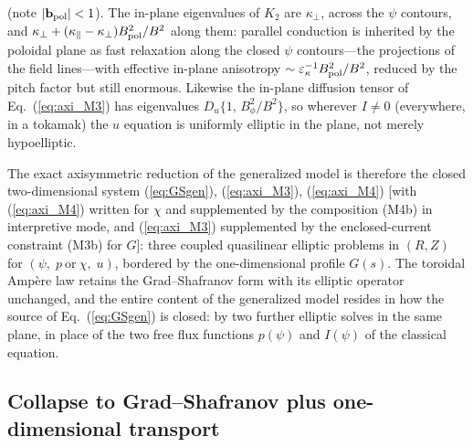 \documentclass[english]{article}
\newcommand{\bb}{\mathbf{b}}
\begin{document}
(note $|\bb_{\rm pol}|<1$). The in-plane eigenvalues of $K_2$ are $\kappa_\perp$, across the
$\psi$ contours, and $\kappa_\perp+(\kappa_\parallel-\kappa_\perp)B_{\rm pol}^{2}/B^{2}$ along
them: parallel conduction is inherited by the poloidal plane as fast relaxation along the closed
$\psi$ contours---the projections of the field lines---with effective in-plane anisotropy
$\sim\varepsilon_\kappa^{-1}B_{\rm pol}^{2}/B^{2}$, reduced by the pitch factor but still
enormous. Likewise the in-plane diffusion tensor of Eq.~(\ref{eq:axi_M3}) has eigenvalues
$D_u\{1,\,B_\phi^{2}/B^{2}\}$, so wherever $I\neq0$ (everywhere, in a tokamak) the $u$ equation is
uniformly elliptic in the plane, not merely hypoelliptic.

The exact axisymmetric reduction of the generalized model is therefore the closed two-dimensional
system (\ref{eq:GSgen}), (\ref{eq:axi_M3}), (\ref{eq:axi_M4}) [with (\ref{eq:axi_M4}) written for
$\chi$ and supplemented by the composition (M4b) in interpretive mode, and (\ref{eq:axi_M3})
supplemented by the enclosed-current constraint (M3b) for $G$]: three coupled quasilinear
elliptic problems in $(R,Z)$ for $(\psi,\;p\ \text{or}\ \chi,\;u)$, bordered by the
one-dimensional profile $G(s)$. The toroidal Amp\`ere law
retains the Grad--Shafranov form with its elliptic operator unchanged, and the entire content of
the generalized model resides in how the source of Eq.~(\ref{eq:GSgen}) is closed: by two further
elliptic solves in the same plane, in place of the two free flux functions $p(\psi)$ and $I(\psi)$
of the classical equation.

\subsection{Collapse to Grad--Shafranov plus one-dimensional transport}
\label{sec:axisym_collapse}
\end{document}
